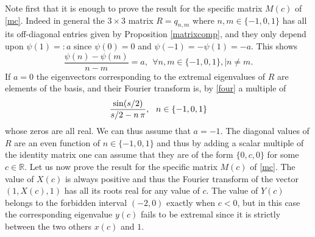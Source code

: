 \documentclass{amsart}
\def\R{{\mathbb R}}
\def\sin{{{\rm sin}}}
\def\R{{\mathbb R}}
\def\sin{{{\rm sin}}}
\begin{document}
\proof Note first that it is enough to prove the result for the specific matrix $M(c)$ of \eqref{mc}. Indeed in general the $3 \times 3$ matrix $R=q_{n,m}$ where $n,m\in \{-1,0,1\}$ has all its off-diagonal entries given by Proposition \ref{matrixcomp}, and they only depend upon $\psi(1)=:a$ since $\psi(0)=0$ and $\psi(-1)=-\psi(1)=-a$. This shows 
$$
 \frac{\psi(n)-\psi(m)}{n-m}=a, \ \ \forall n,m\in \{-1,0,1\}, \mid n\neq m.
$$
If $a=0$ the eigenvectors corresponding to the extremal eigenvalues of $R$ are elements of the basis, and their Fourier transform is, by \eqref{four} a multiple of
 $$\frac{\sin( s/2)}{s/2-n\,\pi }, \ \ n\in \{-1,0,1\}$$
  whose zeros are all real. We can thus assume that $a=-1$. The diagonal values of $R$ are an even function of $n\in \{-1,0,1\}$ and thus by adding a scalar multiple of the identity matrix one can assume that they are of the form $\{0,c,0\}$ for some $c\in \R$. Let us now prove the result for the specific matrix $M(c)$ of \eqref{mc}. 
 The value of $X(c)$ is always positive and thus the Fourier transform of the vector $(1,X(c),1)$ has all its roots real for any value of $c$. The value of $Y(c)$ belongs to the forbidden interval $(-2,0)$ exactly when $c<0$, but in this case the corresponding eigenvalue $y(c)$ fails to be extremal since it is strictly between the two others $x(c)$ and $1$. \endproof 
\end{document}
